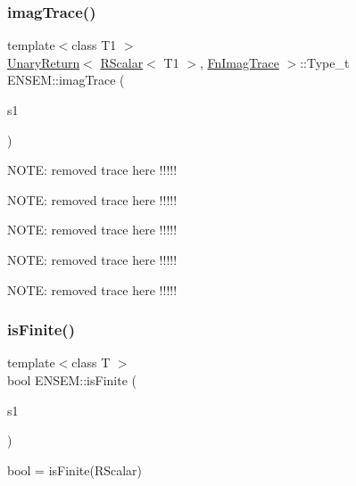 \mbox{\label{group__rscalar_ga93f83573ea0cfc6dca10a8bf879ab0a7}} 
\subsubsection{\texorpdfstring{imagTrace()}{imagTrace()}}
{\footnotesize\ttfamily template$<$class T1 $>$ \\
\mbox{\hyperlink{structENSEM_1_1UnaryReturn}{Unary\+Return}}$<$ \mbox{\hyperlink{classENSEM_1_1RScalar}{R\+Scalar}}$<$ T1 $>$, \mbox{\hyperlink{structENSEM_1_1FnImagTrace}{Fn\+Imag\+Trace}} $>$\+::Type\+\_\+t E\+N\+S\+E\+M\+::imag\+Trace (\begin{DoxyParamCaption}\item[{const \mbox{\hyperlink{classENSEM_1_1RScalar}{R\+Scalar}}$<$ T1 $>$ \&}]{s1 }\end{DoxyParamCaption})\hspace{0.3cm}{\ttfamily [inline]}}

N\+O\+TE\+: removed trace here !!!!!

N\+O\+TE\+: removed trace here !!!!!

N\+O\+TE\+: removed trace here !!!!!

N\+O\+TE\+: removed trace here !!!!!

N\+O\+TE\+: removed trace here !!!!! \mbox{\label{group__rscalar_ga7ec54fb1eaedacb87a42df35a5f11001}} 
\subsubsection{\texorpdfstring{isFinite()}{isFinite()}}
{\footnotesize\ttfamily template$<$class T $>$ \\
bool E\+N\+S\+E\+M\+::is\+Finite (\begin{DoxyParamCaption}\item[{const \mbox{\hyperlink{classENSEM_1_1RScalar}{R\+Scalar}}$<$ T $>$ \&}]{s1 }\end{DoxyParamCaption})}



bool = is\+Finite(\+R\+Scalar) 

